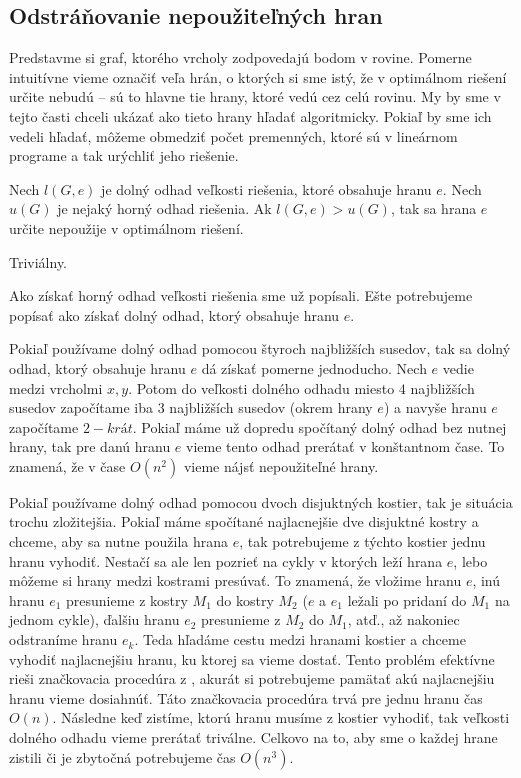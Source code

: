 \subsection{Odstráňovanie nepoužiteľných hran}

Predstavme si graf, ktorého vrcholy zodpovedajú bodom v rovine. Pomerne intuitívne vieme označiť
veľa hrán, o ktorých si sme istý, že v optimálnom riešení určite nebudú -- sú to hlavne tie hrany,
ktoré vedú cez celú rovinu. My by sme v tejto časti chceli ukázať ako tieto hrany
hľadať algoritmicky. Pokiaľ by sme ich vedeli hľadať, môžeme obmedziť počet premenných, ktoré
sú v lineárnom programe a tak urýchliť jeho riešenie.

\begin{lema}
Nech $l(G, e)$ je dolný odhad veľkosti riešenia, ktoré obsahuje hranu $e$.
Nech $u(G)$ je nejaký horný odhad riešenia. Ak $l(G, e) > u(G)$, tak sa hrana $e$ určite nepoužije v
optimálnom riešení.
\end{lema}

\begin{dokaz}
Triviálny.
\end{dokaz}

Ako získať horný odhad veľkosti riešenia sme už popísali. Ešte potrebujeme popísať ako získať dolný
odhad, ktorý obsahuje hranu $e$.

\medskip
Pokiaľ používame dolný odhad pomocou štyroch najbližších susedov, tak sa dolný odhad, ktorý obsahuje
hranu $e$ dá získať pomerne jednoducho. Nech $e$ vedie medzi vrcholmi $x, y$. Potom do veľkosti
dolného odhadu miesto $4$ najbližších susedov započítame iba $3$ najbližších susedov (okrem hrany
$e$) a navyše hranu $e$ započítame $2-krát$. Pokiaľ máme už dopredu spočítaný dolný odhad bez nutnej
hrany, tak pre danú hranu $e$ vieme tento odhad prerátať v konštantnom čase. 
To znamená, že v čase $O(n^2)$ vieme nájsť nepoužiteľné hrany. 

\medskip
Pokiaľ používame dolný odhad pomocou dvoch disjuktných kostier, tak je situácia trochu zložitejšia.
Pokiaľ máme spočítané najlacnejšie dve disjuktné kostry a chceme, aby sa nutne použila hrana $e$,
tak potrebujeme z týchto kostier jednu hranu vyhodiť. Nestačí sa ale len pozrieť na cykly v ktorých
leží hrana $e$, lebo môžeme si hrany medzi kostrami presúvať. To znamená, že vložime hranu $e$, inú
hranu $e_1$ presunieme z kostry $M_1$ do kostry $M_2$ ($e$ a $e_1$ ležali po pridaní do $M_1$ na
jednom cykle), ďalšiu hranu $e_2$ presunieme z $M_2$ do $M_1$, atď., až nakoniec odstraníme hranu
$e_k$. Teda hľadáme cestu medzi hranami kostier a chceme vyhodiť najlacnejšiu hranu, ku ktorej sa
vieme dostať. Tento problém efektívne rieši značkovacia procedúra z \cite{spanning2}, akurát si
potrebujeme pamätať akú najlacnejšiu hranu vieme dosiahnúť. Táto značkovacia procedúra trvá pre
jednu hranu čas $O(n)$. Následne keď zistíme, ktorú hranu musíme z kostier vyhodiť, tak
veľkosti dolného odhadu vieme prerátať triválne. Celkovo na to, aby sme o každej hrane zistili či
je zbytočná potrebujeme čas $O(n^3)$. 

